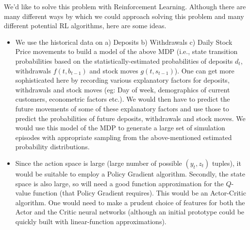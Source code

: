 \documentclass[12pt]{exam}
\begin{document}
\begin{questions}
We'd like to solve this problem with Reinforcement Learning. Although there are many different ways by which we could approach solving this problem and many different potential RL algorithms, here are some ideas.
\begin{itemize}
\item We use the historical data on a) Deposits b) Withdrawals c) Daily Stock Price movements to build a model of the above MDP (i.e., state transition probabilities based on the statistically-estimated probabilities of deposits $d_t$, withdrawals $f(t,b_{t-1})$ and stock moves $g(t,s_{t-1})$). One can get more sophisticated here by recording various explanatory factors for deposits, withdrawals and stock moves (eg: Day of week, demographics of current customers, econometric factors etc.). We would then have to predict the future movements of some of these explanatory factors and use those to predict the probabilities of future deposits, withdrawals and stock moves. We would use this model of the MDP to generate a large set of simulation episodes with appropriate sampling from the above-mentioned estimated probability distributions.
\item Since the action space is large (large number of possible $(y_t,z_t)$ tuples), it would be suitable to employ a Policy Gradient algorithm. Secondly, the state space is also large, so will need a good function approximation for the $Q$-value function (that Policy Gradient requires). This would be an Actor-Critic algorithm. One would need to make a prudent choice of features for both the Actor and the Critic neural networks (although an initial prototype could be quickly built with linear-function approximations).
\end{itemize}
 
\end{questions}
\end{document}
